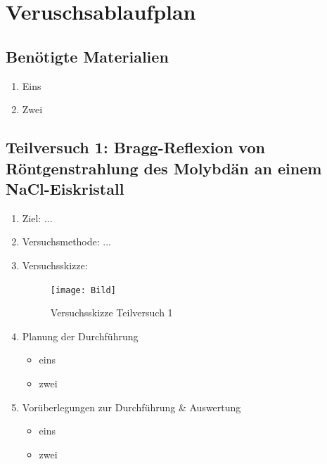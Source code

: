 \documentclass{article}
\begin{document}
\newpage

\section{Veruschsablaufplan}

\subsection{Benötigte Materialien}
    \begin{enumerate}[label=\arabic*.]
        \item Eins
        \item Zwei
    \end{enumerate}

\newpage

\subsection{Teilversuch 1: Bragg-Reflexion von Röntgenstrahlung des Molybdän an einem NaCl-Eiskristall}
\begin{enumerate}[label = (\Roman*)]
    \item Ziel: ...
    
    \item Versuchsmethode: ...
    
    \item Versuchsskizze:
    
        \begin{figure}[H]
        \centering
        \texttt{[image: Bild]}
        \caption{Versuchsskizze Teilversuch 1}
        \end{figure}

    \item Planung der Durchführung
        \begin{itemize}
            \item eins
            \item zwei
        \end{itemize}

    \item Vorüberlegungen zur Durchführung \& Auswertung
        \begin{itemize}
            \item eins
            \item zwei
        \end{itemize}
    
\end{enumerate}
\end{document}
